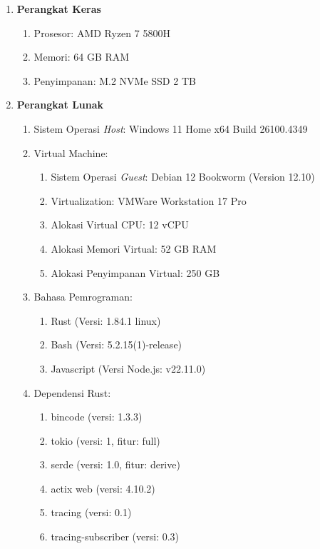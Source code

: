 \begin{enumerate}
	\item \textbf{Perangkat Keras}
	      \begin{enumerate}
		      \item Prosesor: AMD Ryzen 7 5800H
		      \item Memori: 64 GB RAM
		      \item Penyimpanan: M.2 NVMe SSD 2 TB
	      \end{enumerate}
	\item \textbf{Perangkat Lunak}
	      \begin{enumerate}
		      \item Sistem Operasi \textit{Host}: Windows 11 Home x64 Build 26100.4349
		      \item Virtual Machine:
		            \begin{enumerate}
			            \item Sistem Operasi \textit{Guest}: Debian 12 Bookworm (Version 12.10)
			            \item Virtualization: VMWare Workstation 17 Pro
			            \item Alokasi Virtual CPU: 12 vCPU
			            \item Alokasi Memori Virtual: 52 GB RAM
			            \item Alokasi Penyimpanan Virtual: 250 GB
		            \end{enumerate}
		      \item Bahasa Pemrograman:
		            \begin{enumerate}
			            \item Rust (Versi: 1.84.1 linux)
			            \item Bash (Versi: 5.2.15(1)-release)
			            \item Javascript (Versi Node.js: v22.11.0)
		            \end{enumerate}
		      \item Dependensi Rust:
		            \begin{enumerate}
			            \item bincode (versi: 1.3.3)
			            \item tokio (versi: 1, fitur: full)
			            \item serde (versi: 1.0, fitur: derive)
			            \item actix web (versi: 4.10.2)
			            \item tracing (versi: 0.1)
			            \item tracing-subscriber (versi: 0.3)

\end{enumerate}
\end{enumerate}
\end{enumerate}
